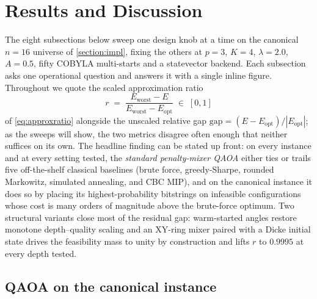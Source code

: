 \section{Results and Discussion}\label{section:result}


The eight subsections below sweep one design knob at a time on the canonical $n=16$ universe of \cref{section:impl}, fixing the others at $p=3$, $K=4$, $\lambda=2.0$, $A=0.5$, fifty COBYLA multi-starts and a statevector backend. Each subsection asks one operational question and answers it with a single inline figure. Throughout we quote the scaled approximation ratio
\begin{equation*}
    r \;=\; \frac{E_{\text{worst}} - E}{E_{\text{worst}} - E_{\text{opt}}} \;\in\; [0,1]
\end{equation*}
of \cref{eq:approxratio} alongside the unscaled relative gap $\mathrm{gap} = (E - E_{\text{opt}})/|E_{\text{opt}}|$; as the sweeps will show, the two metrics disagree often enough that neither suffices on its own. The headline finding can be stated up front: on every instance and at every setting tested, the \emph{standard penalty-mixer QAOA} either ties or trails five off-the-shelf classical baselines (brute force, greedy-Sharpe, rounded Markowitz, simulated annealing, and CBC MIP), and on the canonical instance it does so by placing its highest-probability bitstrings on infeasible configurations whose cost is many orders of magnitude above the brute-force optimum. Two structural variants close most of the residual gap: warm-started angles \parencite{zhou2018qaoa} restore monotone depth--quality scaling and an XY-ring mixer paired with a Dicke initial state \parencite{mancilla2026constrained,bartschi2022dicke} drives the feasibility mass to unity by construction and lifts $r$ to $0.9995$ at every depth tested.


\subsection{QAOA on the canonical instance}\label{subsec:single-run-results}

